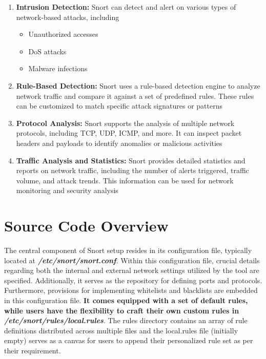 \documentclass[12pt, A4Paper]{article}
\begin{document}
\begin{enumerate}
    \item \textbf{Intrusion Detection:} Snort can detect and alert on various types of network-based attacks, including
    \begin{itemize}
        \item Unauthorized accesses
        \item DoS attacks
        \item Malware infections
    \end{itemize}

    \item \textbf{Rule-Based Detection:} Snort uses a rule-based detection engine to analyze network traffic and compare it against a set of predefined rules. These rules can be customized to match specific attack signatures or patterns

    \item \textbf{Protocol Analysis:} Snort supports the analysis of multiple network protocols, including TCP, UDP, ICMP, and more. It can inspect packet headers and payloads to identify anomalies or malicious activities

    \item \textbf{Traffic Analysis and Statistics:} Snort provides detailed statistics and reports on network traffic, including the number of alerts triggered, traffic volume, and attack trends. This information can be used for network monitoring and security analysis
\end{enumerate}
\vspace{0.4cm}

\section{Source Code Overview}
The central component of Snort setup resides in its configuration file, typically located at \textbf{\textit{/etc/snort/snort.conf}}. Within this configuration file, crucial details regarding both the internal and external network settings utilized by the tool are specified. Additionally, it serves as the repository for defining ports and protocols. Furthermore, provisions for implementing whitelists and blacklists are embedded in this configuration file. \textbf{It comes equipped with a set of default rules, while users have the flexibility to craft their own custom rules in \textit{/etc/snort/rules/local.rules}}. The rules directory contains an array of rule definitions distributed across multiple files and the local.rules file (initially empty) serves as a canvas for users to append their personalized rule set as per their requirement.
\vspace{0.4cm}
\end{document}
